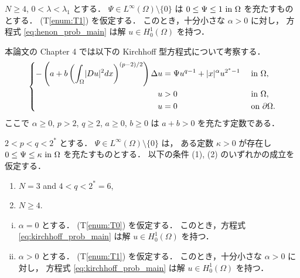 \begin{thm}[Theorem 1.1.1] \label{thm:henon_main}
  $N \geq 4$, $0 < \lambda < \lambda_1$ とする．
  $\Psi \in L^\infty(\Omega) \setminus \{ 0 \}$
  は $0 \leq \Psi \leq 1 \text{ in } \Omega$ を充たすものとする．
  (T\ref{enum:T1}) を仮定する．
  このとき，十分小さな $\alpha > 0$ に対し，
  方程式 \eqref{eq:henon_prob_main}
  は解 $u \in H_0^1(\Omega)$ を持つ．
\end{thm}

本論文の Chapter 4 では以下の Kirchhoff 型方程式について考察する．
\begin{align}
  \left\{
  \begin{aligned}
    - \left( a + b \left( \int_\Omega \lvert Du \rvert^2 dx \right)^{(p-2)/2} \right) \Delta u &= \Psi u^{q-1} + \lvert x \rvert^\alpha u^{2^* - 1}
               &                                                     & \text{ in } \Omega,                        \\
    u          & > 0                                                 &              & \text{ in } \Omega,         \\
    u          & = 0                                                 &              & \text{ on } \partial\Omega.
  \end{aligned}
  \right. \label{eq:kirchhoff_prob_main}
\end{align}
ここで $\alpha \geq 0$, $p > 2$, $q \geq 2$, $a \geq 0$, $b \geq 0$
は $a + b > 0$ を充たす定数である．

\begin{thm}[Theorem~1.1.2] \label{thm:kirchhoff_main}
  $2 < p < q < 2^*$ とする．
  $\Psi \in L^\infty(\Omega) \setminus \{ 0 \}$ は，
  ある定数 $\kappa > 0$ が存在し
  $0 \leq \Psi \leq \kappa \text{ in } \Omega$
  を充たすものとする．
  以下の条件 (1), (2) のいずれかの成立を仮定する．
  \begin{enumerate}[(1)]
    \item $N = 3$ and $4 < q < 2^* = 6$,
    \item $N \geq 4$.
  \end{enumerate}
  \begin{enumerate}[(i)]
    \item
      $\alpha = 0$ とする． (T\ref{enum:T0}) を仮定する．
      このとき，方程式 \eqref{eq:kirchhoff_prob_main}
      は解 $u \in H_0^1(\Omega)$ を持つ．
    \item
      $\alpha > 0$ とする． (T\ref{enum:T1}) を仮定する．
      このとき，十分小さな $\alpha > 0$ に対し，
      方程式 \eqref{eq:kirchhoff_prob_main}
      は解 $u \in H_0^1(\Omega)$ を持つ．
  \end{enumerate}
\end{thm}

